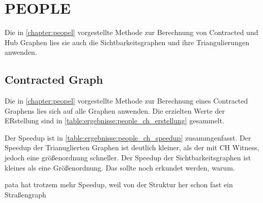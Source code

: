 \section{PEOPLE}

Die in \autoref{chapter:peopel} vorgestellte Methode zur Berechnung von Contracted und Hub Graphen lies sie auch die Sichtbarkeitsgraphen und ihre Triangulierungen anwenden.

\subsection{Contracted Graph}

Die in \autoref{chapter:peopel} vorgestellte Methode zur Berechnung eines Contracted Graphens lies sich auf alle Graphen anwenden.
Die erzielten Werte der ERstellung sind in \autoref{table:ergebnisse:people_ch_erstellung} gesammelt.

Der Speedup ist in \autoref{table:ergebnisse:people_ch_speedup} zusammgenfasst.
Der Speedup der Trianuglierten Graphen ist deutlich kleiner, als der mit CH Witness, jedoch eine größenordnung schneller.
Der Speedup der Sichtbarkeitsgraphen ist kleines als eine Größenordnung.
Das sollte noch erkundet werden, warum.

pata hat trotzem mehr Speedup, weil von der Struktur her schon fast ein Straßengraph

